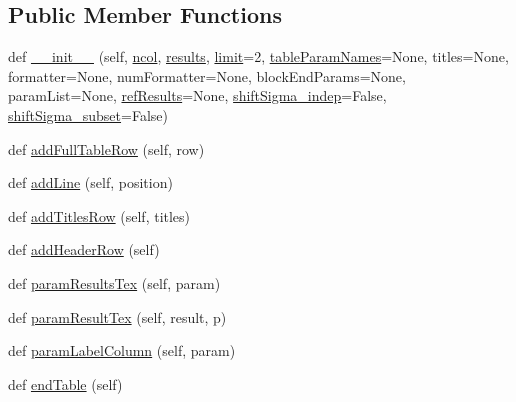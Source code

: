 \subsection*{Public Member Functions}
\begin{DoxyCompactItemize}
\item 
def \mbox{\hyperlink{classgetdist_1_1types_1_1ResultTable_abb0448cf00e3aa3b9f5457be49cd7c4d}{\+\_\+\+\_\+init\+\_\+\+\_\+}} (self, \mbox{\hyperlink{classgetdist_1_1types_1_1ResultTable_a020be5a94df368053d01744a206bfaa0}{ncol}}, \mbox{\hyperlink{classgetdist_1_1types_1_1ResultTable_a087b78232c8c79d2a61c647016998607}{results}}, \mbox{\hyperlink{classgetdist_1_1types_1_1ResultTable_ae3f612b398b5fe2ece1d5e7904c3ae9f}{limit}}=2, \mbox{\hyperlink{classgetdist_1_1types_1_1ResultTable_a5a3d001786c7f35d3cb3240ecbe0fed5}{table\+Param\+Names}}=None, titles=None, formatter=None, num\+Formatter=None, block\+End\+Params=None, param\+List=None, \mbox{\hyperlink{classgetdist_1_1types_1_1ResultTable_ac9bcce42fb0ec55746dae00b16b01064}{ref\+Results}}=None, \mbox{\hyperlink{classgetdist_1_1types_1_1ResultTable_aaa2d548e5a813f0373cbea1d48a1c6e3}{shift\+Sigma\+\_\+indep}}=False, \mbox{\hyperlink{classgetdist_1_1types_1_1ResultTable_a3061ea76fbf3054306c6c6c5f4972a1e}{shift\+Sigma\+\_\+subset}}=False)
\item 
def \mbox{\hyperlink{classgetdist_1_1types_1_1ResultTable_aa355a2d81bd343f2b76bd9e0a16a88af}{add\+Full\+Table\+Row}} (self, row)
\item 
def \mbox{\hyperlink{classgetdist_1_1types_1_1ResultTable_a3f3e2d577f045de380ac50e1f3c21483}{add\+Line}} (self, position)
\item 
def \mbox{\hyperlink{classgetdist_1_1types_1_1ResultTable_ae953a90c736afd2c64411202fc8cb08f}{add\+Titles\+Row}} (self, titles)
\item 
def \mbox{\hyperlink{classgetdist_1_1types_1_1ResultTable_a28c08230c64a8509fe2f98dbe91487c2}{add\+Header\+Row}} (self)
\item 
def \mbox{\hyperlink{classgetdist_1_1types_1_1ResultTable_addfef62f3aa37ec0b38785d6cd890595}{param\+Results\+Tex}} (self, param)
\item 
def \mbox{\hyperlink{classgetdist_1_1types_1_1ResultTable_a685e0efc6bb8273a2ea109022fc5da59}{param\+Result\+Tex}} (self, result, p)
\item 
def \mbox{\hyperlink{classgetdist_1_1types_1_1ResultTable_ae48ef77cd332e1199779bd19aca6d8a3}{param\+Label\+Column}} (self, param)
\item 
def \mbox{\hyperlink{classgetdist_1_1types_1_1ResultTable_a286ee12621c18db5a76b4b5f9c1b1eb6}{end\+Table}} (self)

\end{DoxyCompactItemize}
